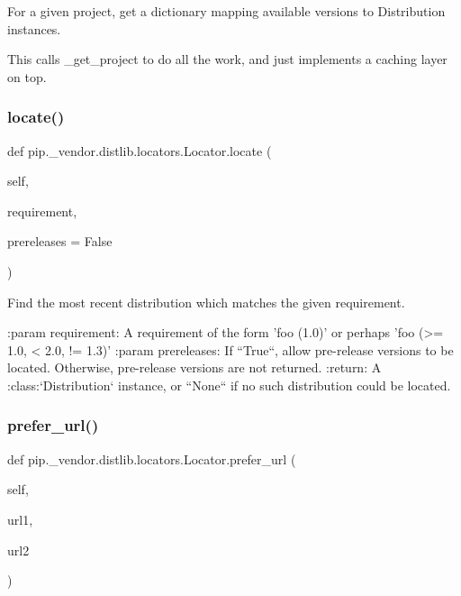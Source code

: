 \begin{DoxyVerb}For a given project, get a dictionary mapping available versions to Distribution
instances.

This calls _get_project to do all the work, and just implements a caching layer on top.
\end{DoxyVerb}
 \mbox{\label{classpip_1_1__vendor_1_1distlib_1_1locators_1_1Locator_a52564972db53ebf3ebfc4ec6bf2020e3}} 
\subsubsection{\texorpdfstring{locate()}{locate()}}
{\footnotesize\ttfamily def pip.\+\_\+vendor.\+distlib.\+locators.\+Locator.\+locate (\begin{DoxyParamCaption}\item[{}]{self,  }\item[{}]{requirement,  }\item[{}]{prereleases = {\ttfamily False} }\end{DoxyParamCaption})}

\begin{DoxyVerb}Find the most recent distribution which matches the given
requirement.

:param requirement: A requirement of the form 'foo (1.0)' or perhaps
            'foo (>= 1.0, < 2.0, != 1.3)'
:param prereleases: If ``True``, allow pre-release versions
            to be located. Otherwise, pre-release versions
            are not returned.
:return: A :class:`Distribution` instance, or ``None`` if no such
 distribution could be located.
\end{DoxyVerb}
 \mbox{\label{classpip_1_1__vendor_1_1distlib_1_1locators_1_1Locator_ae6ca5b000e41016c8ddd878969b15b1e}} 
\subsubsection{\texorpdfstring{prefer\+\_\+url()}{prefer\_url()}}
{\footnotesize\ttfamily def pip.\+\_\+vendor.\+distlib.\+locators.\+Locator.\+prefer\+\_\+url (\begin{DoxyParamCaption}\item[{}]{self,  }\item[{}]{url1,  }\item[{}]{url2 }\end{DoxyParamCaption})}

